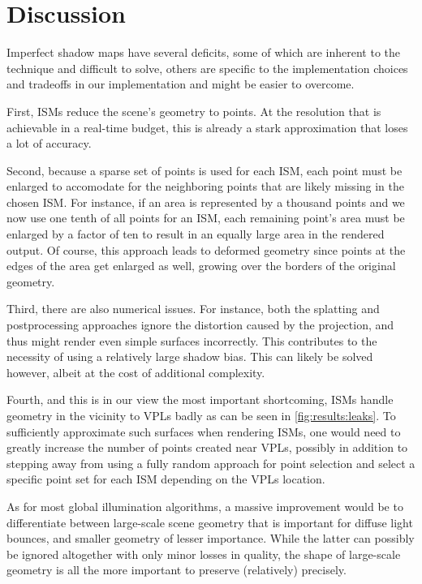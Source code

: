  \section{Discussion}


 Imperfect shadow maps have several deficits, some of which are inherent to the technique and difficult to solve, others are specific to the implementation choices and tradeoffs in our implementation and might be easier to overcome.

 First, ISMs reduce the scene's geometry to points. At the resolution that is achievable in a real-time budget, this is already a stark approximation that loses a lot of accuracy.

 Second, because a sparse set of points is used for each ISM, each point must be enlarged to accomodate for the neighboring points that are likely missing in the chosen ISM. For instance, if an area is represented by a thousand points and we now use one tenth of all points for an ISM, each remaining point's area must be enlarged by a factor of ten to result in an equally large area in the rendered output. Of course, this approach leads to deformed geometry since points at the edges of the area get enlarged as well, growing over the borders of the original geometry.

 Third, there are also numerical issues. For instance, both the splatting and postprocessing approaches ignore the distortion caused by the projection, and thus might render even simple surfaces incorrectly. This contributes to the necessity of using a relatively large shadow bias. This can likely be solved however, albeit at the cost of additional complexity.

 Fourth, and this is in our view the most important shortcoming, ISMs handle geometry in the vicinity to VPLs badly as can be seen in \cref{fig:results:leaks}. To sufficiently approximate such surfaces when rendering ISMs, one would need to greatly increase the number of points created near VPLs, possibly in addition to stepping away from using a fully random approach for point selection and select a specific point set for each ISM depending on the VPLs location.

 As for most global illumination algorithms, a massive improvement would be to differentiate between large-scale scene geometry that is important for diffuse light bounces, and smaller geometry of lesser importance. While the latter can possibly be ignored altogether with only minor losses in quality, the shape of large-scale geometry is all the more important to preserve (relatively) precisely.



